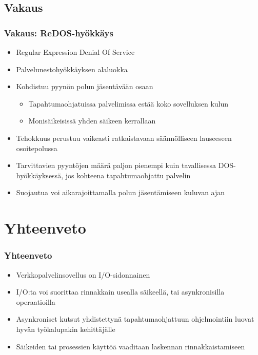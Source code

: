 \documentclass{beamer}
\begin{document}
\subsection{Vakaus}
\begin{frame}
  \frametitle{Vakaus: ReDOS-hyökkäys}
  \begin{itemize}
    \item Regular Expression Denial Of Service
    \item Palvelunestohyökkäyksen alaluokka
    \item Kohdistuu pyynön polun jäsentävään osaan
      \begin{itemize}
        \item Tapahtumaohjatuissa palvelimissa estää koko sovelluksen kulun
        \item Monisäikeisissä yhden säikeen kerrallaan
      \end{itemize}
    \item Tehokkuus perustuu vaikeasti ratkaistavaan säännölliseen lauseeseen
      osoitepolussa
    \item Tarvittavien pyyntöjen määrä paljon pienempi kuin tavallisessa
      DOS-hyökkäyksessä, jos kohteena tapahtumaohjattu palvelin
    \item Suojautua voi aikarajoittamalla polun jäsentämiseen kuluvan
      ajan
  \end{itemize}
\end{frame}
\section{Yhteenveto}
\begin{frame}
  \frametitle{Yhteenveto}
  \begin{itemize}
    \item Verkkopalvelinsovellus on I/O-sidonnainen
    \item I/O:ta voi suorittaa rinnakkain usealla säikeellä,
      tai asynkronisilla operaatioilla
    \item Asynkroniset kutsut yhdistettynä tapahtumaohjattuun
      ohjelmointiin luovat hyvän työkalupakin kehittäjälle
    \item Säikeiden tai prosessien käyttöä vaaditaan
      laskennan rinnakkaistamiseen
  \end{itemize}
\end{frame}
\end{document}
